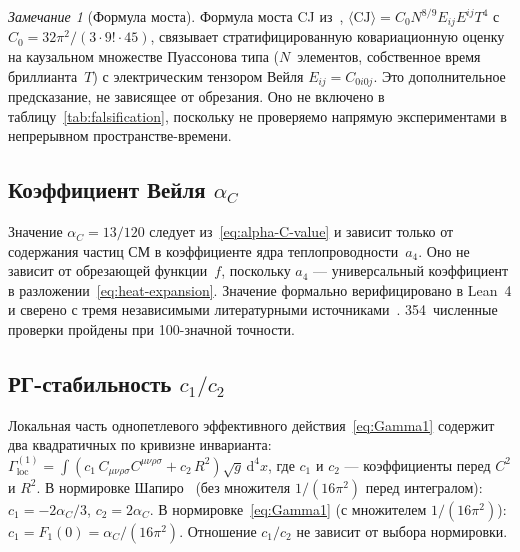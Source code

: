 \documentclass[12pt,a4paper]{article}
\theoremstyle{plain}
\theoremstyle{definition}
\theoremstyle{remark}
\newtheorem{remark}[theorem]{Замечание}
\newcommand{\dd}{\mathrm{d}}
\newcommand{\Weylsq}{C_{\mu\nu\rho\sigma}C^{\mu\nu\rho\sigma}}
\begin{document}
\begin{remark}[Формула моста]
Формула моста CJ из~\cite{Alfyorov:2026paper7},
$\langle \mathrm{CJ} \rangle = C_0 N^{8/9} E_{ij}E^{ij} T^4$
с $C_0 = 32\pi^2/(3 \cdot 9! \cdot 45)$, связывает
стратифицированную ковариационную оценку на каузальном множестве
Пуассонова типа ($N$~элементов, собственное время
бриллианта~$T$) с электрическим тензором Вейля
$E_{ij} = C_{0i0j}$. Это дополнительное предсказание, не зависящее
от обрезания. Оно не включено в таблицу~\ref{tab:falsification},
поскольку не проверяемо напрямую экспериментами в непрерывном
пространстве-времени.
\end{remark}

\subsection{Коэффициент Вейля $\alpha_C$}
\label{sec:alphaC}

Значение $\alpha_C = 13/120$ следует из~\eqref{eq:alpha-C-value}
и зависит только от содержания частиц СМ в коэффициенте ядра
теплопроводности~$a_4$. Оно не зависит от обрезающей функции~$f$,
поскольку $a_4$ --- универсальный коэффициент
в разложении~\eqref{eq:heat-expansion}. Значение формально
верифицировано в Lean~4 и сверено с тремя независимыми
литературными источниками~\cite{CZ:2012,CPR:2008,ParkerToms:2009}.
354~численные проверки пройдены при 100-значной точности.

\subsection{РГ-стабильность $c_1/c_2$}
\label{sec:running}

Локальная часть однопетлевого эффективного действия~\eqref{eq:Gamma1}
содержит два квадратичных по кривизне инварианта:
$\Gamma^{(1)}_{\mathrm{loc}} = \int (c_1\, \Weylsq + c_2\, R^2)
\sqrt{g}\,\dd^4 x$,
где $c_1$ и $c_2$ --- коэффициенты перед $C^2$ и $R^2$.
В нормировке Шапиро~\cite{Shapiro:2004} (без множителя
$1/(16\pi^2)$ перед интегралом): $c_1 = -2\alpha_C/3$,
$c_2 = 2\alpha_C$. В нормировке~\eqref{eq:Gamma1} (с
множителем $1/(16\pi^2)$): $c_1 = F_1(0) = \alpha_C/(16\pi^2)$.
Отношение $c_1/c_2$ не зависит от выбора нормировки.
\end{document}
